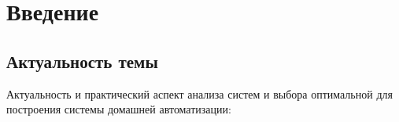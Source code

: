 \documentclass[14pt, a4paper]{extreport}
\begin{document}
\newpage

\renewcommand{\contentsname}{\hspace*{\fill}Содержание\hspace*{\fill}\vspace*{-3em}}

\tableofcontents



\newpage




\chapter{Введение}

\section{Актуальность темы}

Актуальность и практический аспект анализа систем и выбора оптимальной для построения системы домашней автоматизации:
\end{document}
